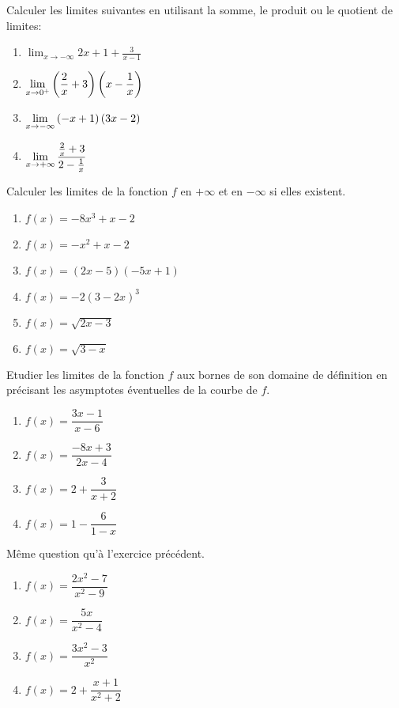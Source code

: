 \begin{exercice}
Calculer les limites suivantes en utilisant la somme, le produit ou le quotient de limites:
\begin{enumerate}
\item
   $\displaystyle \lim_{x \to -\infty} 2x+1+\frac{3}{x-1}$
\item \; $ \displaystyle \lim_{x\to 0^+}\left(\frac{2}{x}+3\right)\left(x-\frac{1}{x}\right) $

\item $ \displaystyle\lim_{x \to -\infty}\left(-x+1\right)\left(3x-2\right)$ 
\item \; $ \displaystyle \lim_{x\to +\infty}\dfrac{\frac{2}{x}+3}{2-\frac{1}{x}} $
\end{enumerate}
\end{exercice}
\begin{exercice} 
Calculer les limites de la fonction $ f $  en $+\infty $ et en  $-\infty $ si elles existent.
\begin{enumerate}
\item $f(x)= -8x^3+x-2$
\item $f(x)=-x^2+x-2$

\item $f(x)=(2x-5)(-5x+1)$
\item $f(x)=-2(3-2x)^3$

\item $f(x)=\sqrt{2x-3}$
\item $f(x)=\sqrt{3-x}$
\end{enumerate}
\end{exercice}
\begin{exercice}
Etudier les limites de la fonction $ f $  aux bornes de son domaine de définition en précisant  les asymptotes éventuelles de la courbe de $ f $.
\begin{enumerate}
\item $f(x)= \dfrac{3x-1}{x-6}$
\item $f(x)= \dfrac{-8x+3}{2x-4}$

\item $f(x)=2+\dfrac{3}{x+2}$
\item $f(x)=1-\dfrac{6}{1-x}$
\end{enumerate}
\end{exercice}
\begin{exercice}
Même question qu'à l'exercice précédent.
\begin{enumerate}
\item $f(x)= \dfrac{2x^2-7}{x^2-9}$
\item $f(x)= \dfrac{5x}{x^2-4}$

\item $f(x)= \dfrac{3x^2-3}{x^2}$
\item $f(x)=2+\dfrac{x+1}{x^2+2}$
\end{enumerate}
\end{exercice}
